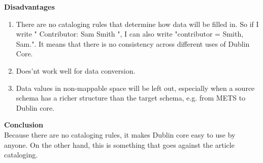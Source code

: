\begin{enumerate}
	{\bf Disadvantages}
	\begin{enumerate}
		\item There are no cataloging rules that determine how data will be filled in. 
		So if I write " Contributor: Sam Smith ", I can also write "contributor = Smith, Sam.". 
			It means that there is no consistency across different uses of Dublin Core.
		\item Does'nt work well for data conversion.
		\item Data values in non-mappable space will be left out, especially when a source schema has a richer structure than the target schema, e.g. from METS to Dublin core.
	\end{enumerate}
	{\bf Conclusion}\\
	Because there are no cataloging rules, it makes Dublin core easy to use by anyone. 
	On the other hand, this is something that goes against the article cataloging.
		
\end{enumerate}
	
\newpage %







